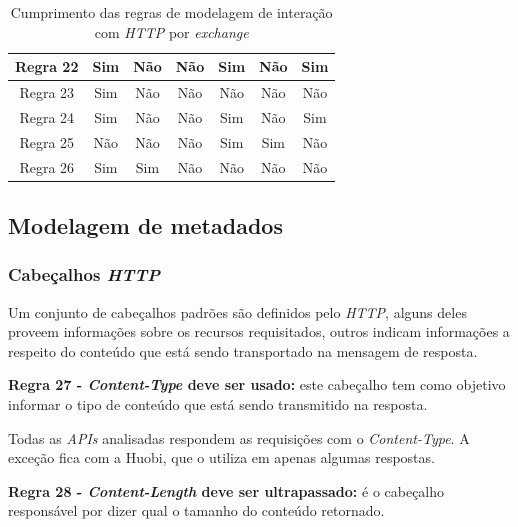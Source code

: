 \begin{table}[h]
\begin{tabular}{|c|c|c|c|c|c|c|}
        Regra 22        & Sim                & Não                & Não               & Sim                 & Não                & Sim              \\ \hline
        Regra 23        & Sim                & Não                & Não               & Não                 & Não                & Não              \\ \hline
        Regra 24        & Sim                & Não                & Não               & Sim                 & Não                & Sim              \\ \hline
        Regra 25        & Não                & Não                & Não               & Sim                 & Sim                & Não              \\ \hline
        Regra 26        & Sim                & Sim                & Não               & Não                 & Não                & Não              \\ \hline
    \end{tabular}
    \caption{Cumprimento das regras de modelagem de interação com \textit{HTTP} por \textit{exchange}}
    \label{tab:table-4}
\end{table}

\subsection{Modelagem de metadados}

\subsubsection{Cabeçalhos \textit{HTTP}}

Um conjunto de cabeçalhos padrões são definidos pelo \textit{HTTP}, alguns deles proveem informações sobre os recursos requisitados, outros indicam informações a respeito do conteúdo que está sendo transportado na mensagem de resposta.

\textbf{Regra 27 - \textit{Content-Type} deve ser usado:} este cabeçalho tem como objetivo informar o tipo de conteúdo que está sendo transmitido na resposta.

Todas as \textit{APIs} analisadas respondem as requisições com o \textit{Content-Type}. A exceção fica com a Huobi, que o utiliza em apenas algumas respostas.

\textbf{Regra 28 - \textit{Content-Length} deve ser ultrapassado:} é o cabeçalho responsável por dizer qual o tamanho do conteúdo retornado.

